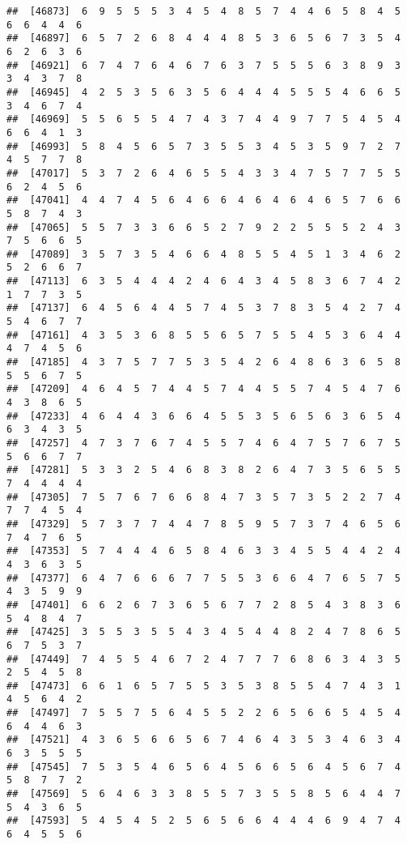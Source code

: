 \documentclass[
]{book}
\begin{document}
\begin{verbatim}
##  [46873]  6  9  5  5  5  3  4  5  4  8  5  7  4  4  6  5  8  4  5  6  6  4  4  6
##  [46897]  6  5  7  2  6  8  4  4  4  8  5  3  6  5  6  7  3  5  4  6  2  6  3  6
##  [46921]  6  7  4  7  6  4  6  7  6  3  7  5  5  5  6  3  8  9  3  3  4  3  7  8
##  [46945]  4  2  5  3  5  6  3  5  6  4  4  4  5  5  5  4  6  6  5  3  4  6  7  4
##  [46969]  5  5  6  5  5  4  7  4  3  7  4  4  9  7  7  5  4  5  4  6  6  4  1  3
##  [46993]  5  8  4  5  6  5  7  3  5  5  3  4  5  3  5  9  7  2  7  4  5  7  7  8
##  [47017]  5  3  7  2  6  4  6  5  5  4  3  3  4  7  5  7  7  5  5  6  2  4  5  6
##  [47041]  4  4  7  4  5  6  4  6  6  4  6  4  6  4  6  5  7  6  6  5  8  7  4  3
##  [47065]  5  5  7  3  3  6  6  5  2  7  9  2  2  5  5  5  2  4  3  7  5  6  6  5
##  [47089]  3  5  7  3  5  4  6  6  4  8  5  5  4  5  1  3  4  6  2  5  2  6  6  7
##  [47113]  6  3  5  4  4  4  2  4  6  4  3  4  5  8  3  6  7  4  2  1  7  7  3  5
##  [47137]  6  4  5  6  4  4  5  7  4  5  3  7  8  3  5  4  2  7  4  5  4  6  7  7
##  [47161]  4  3  5  3  6  8  5  5  6  5  7  5  5  4  5  3  6  4  4  4  7  4  5  6
##  [47185]  4  3  7  5  7  7  5  3  5  4  2  6  4  8  6  3  6  5  8  5  5  6  7  5
##  [47209]  4  6  4  5  7  4  4  5  7  4  4  5  5  7  4  5  4  7  6  4  3  8  6  5
##  [47233]  4  6  4  4  3  6  6  4  5  5  3  5  6  5  6  3  6  5  4  6  3  4  3  5
##  [47257]  4  7  3  7  6  7  4  5  5  7  4  6  4  7  5  7  6  7  5  5  6  6  7  7
##  [47281]  5  3  3  2  5  4  6  8  3  8  2  6  4  7  3  5  6  5  5  7  4  4  4  4
##  [47305]  7  5  7  6  7  6  6  8  4  7  3  5  7  3  5  2  2  7  4  7  7  4  5  4
##  [47329]  5  7  3  7  7  4  4  7  8  5  9  5  7  3  7  4  6  5  6  7  4  7  6  5
##  [47353]  5  7  4  4  4  6  5  8  4  6  3  3  4  5  5  4  4  2  4  4  3  6  3  5
##  [47377]  6  4  7  6  6  6  7  7  5  5  3  6  6  4  7  6  5  7  5  4  3  5  9  9
##  [47401]  6  6  2  6  7  3  6  5  6  7  7  2  8  5  4  3  8  3  6  5  4  8  4  7
##  [47425]  3  5  5  3  5  5  4  3  4  5  4  4  8  2  4  7  8  6  5  6  7  5  3  7
##  [47449]  7  4  5  5  4  6  7  2  4  7  7  7  6  8  6  3  4  3  5  2  5  4  5  8
##  [47473]  6  6  1  6  5  7  5  5  3  5  3  8  5  5  4  7  4  3  1  4  5  6  4  2
##  [47497]  7  5  5  7  5  6  4  5  5  2  2  6  5  6  6  5  4  5  4  6  4  4  6  3
##  [47521]  4  3  6  5  6  6  5  6  7  4  6  4  3  5  3  4  6  3  4  6  3  5  5  5
##  [47545]  7  5  3  5  4  6  5  6  4  5  6  6  5  6  4  5  6  7  4  5  8  7  7  2
##  [47569]  5  6  4  6  3  3  8  5  5  7  3  5  5  8  5  6  4  4  7  5  4  3  6  5
##  [47593]  5  4  5  4  5  2  5  6  5  6  6  4  4  4  6  9  4  7  4  6  4  5  5  6

\end{verbatim}
\end{document}
